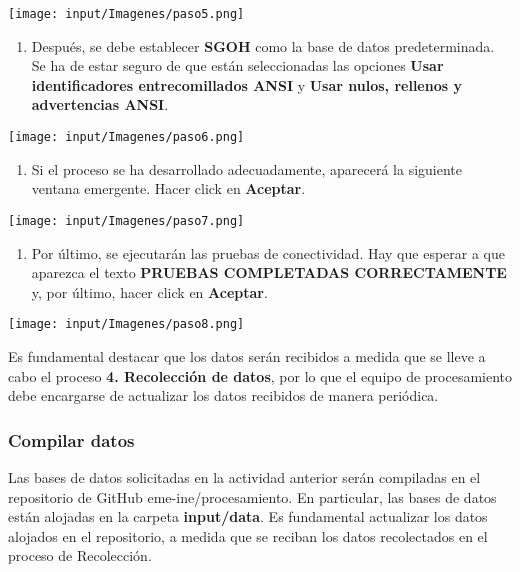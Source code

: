 \documentclass[
]{article}
\providecommand{\tightlist}{%
  \setlength{\itemsep}{0pt}\setlength{\parskip}{0pt}}
\begin{document}
\texttt{[image: input/Imagenes/paso5.png]}

\begin{enumerate}
\def\labelenumi{\alph{enumi})}
\setcounter{enumi}{5}
\tightlist
\item
  Después, se debe establecer \textbf{SGOH} como la base de datos predeterminada. Se ha de estar seguro de que están seleccionadas las opciones \textbf{Usar identificadores entrecomillados ANSI} y \textbf{Usar nulos, rellenos y advertencias ANSI}.
\end{enumerate}

\texttt{[image: input/Imagenes/paso6.png]}

\begin{enumerate}
\def\labelenumi{\alph{enumi})}
\setcounter{enumi}{6}
\tightlist
\item
  Si el proceso se ha desarrollado adecuadamente, aparecerá la siguiente ventana emergente. Hacer click en \textbf{Aceptar}.
\end{enumerate}

\texttt{[image: input/Imagenes/paso7.png]}

\begin{enumerate}
\def\labelenumi{\alph{enumi})}
\setcounter{enumi}{7}
\tightlist
\item
  Por último, se ejecutarán las pruebas de conectividad. Hay que esperar a que aparezca el texto \textbf{PRUEBAS COMPLETADAS CORRECTAMENTE} y, por último, hacer click en \textbf{Aceptar}.
\end{enumerate}

\texttt{[image: input/Imagenes/paso8.png]}

Es fundamental destacar que los datos serán recibidos a medida que se lleve a cabo el proceso \textbf{4. Recolección de datos}, por lo que el equipo de procesamiento debe encargarse de actualizar los datos recibidos de manera periódica.

\hypertarget{compilar-datos}{%
\subsubsection{Compilar datos}\label{compilar-datos}}

Las bases de datos solicitadas en la actividad anterior serán compiladas en el repositorio de GitHub eme-ine/procesamiento. En particular, las bases de datos están alojadas en la carpeta \textbf{input/data}. Es fundamental actualizar los datos alojados en el repositorio, a medida que se reciban los datos recolectados en el proceso de Recolección.
\end{document}
